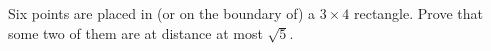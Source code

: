 Six points are placed in (or on the boundary of) a $3\times4$ rectangle. Prove that some two of them are at distance at most $\sqrt5$.
